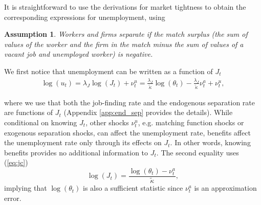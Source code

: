 \documentclass[12pt]{article}
\newcommand{\1}{\mathbf{1}}
\newtheorem{assumption}{Assumption}
\newcommand{\beq}{\begin{eqnarray}}
\newcommand{\eeq}{\end{eqnarray}}
\begin{document}
It is straightforward to use the derivations for market tightness to obtain the corresponding expressions for unemployment, using 
\begin{assumption}\label{ass:eff_sep}
Workers and firms separate if the match surplus (the sum of values of the worker and the firm in the match minus the sum of values of a vacant job and unemployed worker) is negative.
\end{assumption}

We first notice that unemployment can be written as a function of $J_t$ 
\beq
\log(u_t) = \lambda_J \log(J_t) + \nu^u_t = \frac{\lambda_J}{\tilde{\kappa}} \log(\theta_t) - \frac{\lambda_J}{\tilde{\kappa}}  \nu^a_t + \nu^u_t, \label{eq:uJ}
\eeq

where we use that both the job-finding rate and the endogenous separation rate are functions of $J_t$ (Appendix \ref{app:end_sep} provides the details). 
While conditional on knowing $J_t$, other shocks $\nu^u_t$, e.g. matching function shocks or exogenous separation shocks, can affect the unemployment rate, benefits affect the unemployment rate only through its effects on $J_t$. 
In other words, knowing benefits provides no additional information to $J_t$. The second equality uses  (\ref{eq:jc})  
\begin{equation}
 \log(J_t)  = \frac{\log(\theta_t)-  \nu^a_t}{\tilde{\kappa}},
\end{equation}
implying that $\log(\theta_t)$ is also a sufficient statistic since  $\nu^a_t$ is an approximation error.
\end{document}
